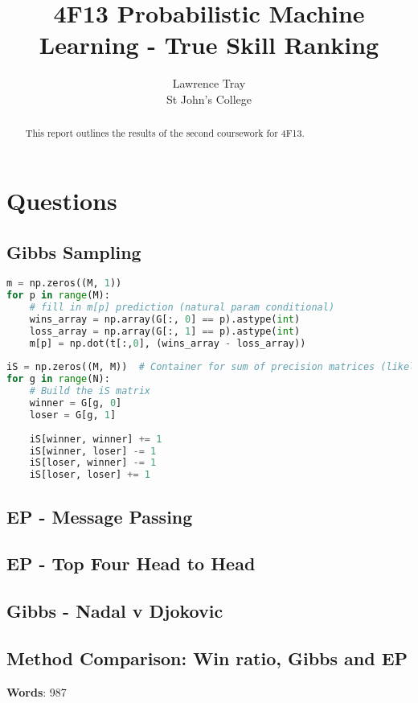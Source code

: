 \documentclass[]{article}
\title{4F13 Probabilistic Machine Learning - True Skill Ranking}
\author{Lawrence Tray \\ St John's College}
\begin{document}


\setcounter{page}{1}
\maketitle

\begin{abstract}
This report outlines the results of the second coursework for 4F13. 
\end{abstract}

\tableofcontents

\section{Questions}
\subsection{Gibbs Sampling}

\begin{lstlisting}[frame=single, caption={Gibbs sampling additions}, label={lst:gibbs}, language={python}]
m = np.zeros((M, 1))
for p in range(M):
	# fill in m[p] prediction (natural param conditional)
	wins_array = np.array(G[:, 0] == p).astype(int)
	loss_array = np.array(G[:, 1] == p).astype(int)
	m[p] = np.dot(t[:,0], (wins_array - loss_array))
	
iS = np.zeros((M, M))  # Container for sum of precision matrices (likelihood terms)
for g in range(N):
	# Build the iS matrix
	winner = G[g, 0]
	loser = G[g, 1]
	
	iS[winner, winner] += 1
	iS[winner, loser] -= 1
	iS[loser, winner] -= 1
	iS[loser, loser] += 1
\end{lstlisting}

\subsection{EP - Message Passing}


\subsection{EP - Top Four Head to Head}


\subsection{Gibbs - Nadal v Djokovic}


\subsection{Method Comparison: Win ratio, Gibbs and EP}

\textbf{Words}: 987
\end{document}
